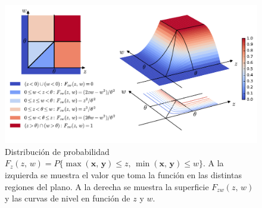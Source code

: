 \documentclass[a4paper]{report}
\newcommand{\x}{\mathbf{x}}
\newcommand{\y}{\mathbf{y}}
\begin{document}
\begin{figure}[!htb]
\begin{center}
 \includegraphics[width=1\columnwidth]{figuras/joint_distribution_region_rv_min_max_surface_colormap_v4.pdf}
\caption{\label{fig:joint_distribution_region_rv_min_max_surface_colormap_v4} Distribución de probabilidad \(F_z(z,\,w)=P\{\max(\x,\,\y)\leq z,\,\min(\x,\,\y)\leq w\}\). A la izquierda se muestra el valor que toma la función en las distintas regiones del plano. A la derecha se muestra la superficie \(F_{zw}(z,\,w)\) y las curvas de nivel en función de \(z\) y \(w\).}
\end{center}
\end{figure}
\end{document}
